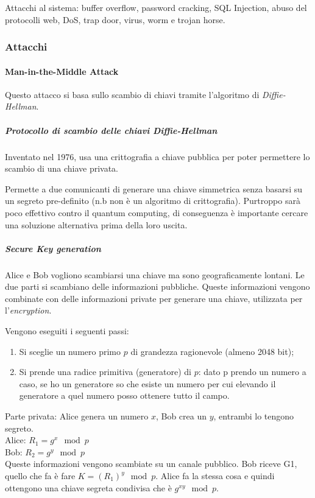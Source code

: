Attacchi al sistema: buffer overflow, password cracking, SQL Injection, abuso 
del protocolli web, DoS, trap door, virus, worm e trojan horse.

\subsubsection{Attacchi}

\paragraph{Man-in-the-Middle Attack}

Questo attacco si basa sullo scambio di chiavi tramite l'algoritmo di
\textit{Diffie-Hellman}.

\subparagraph{Protocollo di scambio delle chiavi Diffie-Hellman}

Inventato nel 1976, usa una crittografia a chiave pubblica per poter 
permettere lo scambio di una chiave privata.

Permette a due comunicanti di generare una chiave simmetrica senza basarsi su
un segreto pre-definito (n.b non è un algoritmo di crittografia).
Purtroppo sarà poco effettivo contro il quantum computing, di conseguenza è 
importante cercare una soluzione alternativa prima della loro uscita.

\subparagraph{Secure Key generation}

Alice e Bob vogliono scambiarsi una chiave ma sono geograficamente lontani.
Le due parti si scambiano delle informazioni pubbliche. Queste informazioni
vengono combinate con delle informazioni private per generare una chiave,
utilizzata per l'\textit{encryption}.


Vengono eseguiti i seguenti passi:

\begin{enumerate}
 \item Si sceglie un numero primo $p$ di grandezza ragionevole (almeno 2048
 bit);
 \item Si prende una radice primitiva (generatore) di $p$: dato p prendo un
 numero a caso, se ho un generatore so che esiste un numero per cui elevando il
 generatore a quel numero posso ottenere tutto il campo.
\end{enumerate}


Parte privata: Alice genera un numero $x$, Bob crea un $y$, entrambi lo tengono
segreto.\\
\newline
Alice: $R_1 = g^x \mod p$\\
Bob: $R_2 = g^y \mod p$\\
\newline
Queste informazioni vengono scambiate su un canale pubblico. Bob riceve G1, 
quello che fa è fare $K = (R_1)^y \mod p$. Alice fa la stessa cosa e quindi 
ottengono una chiave segreta condivisa che è $g^{xy} \mod p$.


